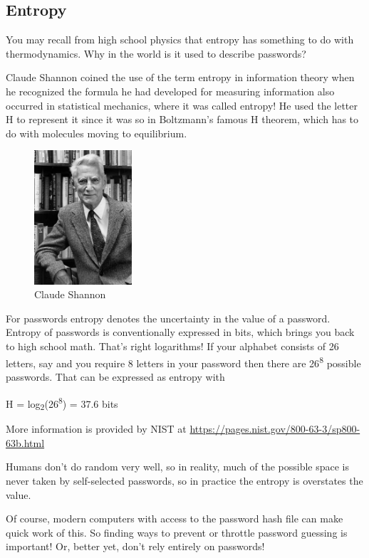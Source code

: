 \hypertarget{entropy}{%
\subsection{Entropy}\label{entropy}}

You may recall from high school physics that entropy has something to do
with thermodynamics. Why in the world is it used to describe passwords?

Claude Shannon coined the use of the term entropy in information theory
when he recognized the formula he had developed for measuring
information also occurred in statistical mechanics, where it was called
entropy! He used the letter H to represent it since it was so in
Boltzmann's famous H theorem, which has to do with molecules moving to
equilibrium.

\begin{figure}
\vspace{-8pt}
\includegraphics[width=1.425in,height=1.96181in]{./05_authentication/01_passwords/30_entropy/media/image1.jpeg}
\caption{Claude Shannon}
\end{figure}
For
passwords entropy denotes the uncertainty in the value of a password.
Entropy of passwords is conventionally expressed in bits, which brings
you back to high school math. That's right logarithms! If your alphabet
consists of 26 letters, say and you require 8 letters in your password
then there are 26\textsuperscript{8} possible passwords. That can be
expressed as entropy with

H = log\textsubscript{2}(26\textsuperscript{8}) = 37.6 bits

More information is provided by NIST at
\url{https://pages.nist.gov/800-63-3/sp800-63b.html}

Humans don't do random very well, so in reality, much of the possible
space is never taken by self-selected passwords, so in practice the
entropy is overstates the value.

Of course, modern computers with access to the password hash file can
make quick work of this. So finding ways to prevent or throttle password
guessing is important! Or, better yet, don't rely entirely on passwords!
